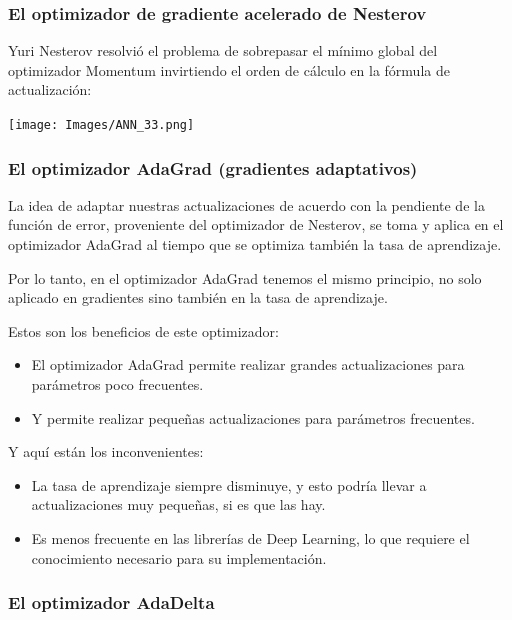 \documentclass[
]{book}
\providecommand{\tightlist}{%
  \setlength{\itemsep}{0pt}\setlength{\parskip}{0pt}}
\begin{document}
\hypertarget{el-optimizador-de-gradiente-acelerado-de-nesterov}{%
\subsubsection{El optimizador de gradiente acelerado de Nesterov}\label{el-optimizador-de-gradiente-acelerado-de-nesterov}}

Yuri Nesterov resolvió el problema de sobrepasar el mínimo global del optimizador Momentum invirtiendo el orden de cálculo en la fórmula de actualización:

\texttt{[image: Images/ANN\_33.png]}

\hypertarget{el-optimizador-adagrad-gradientes-adaptativos}{%
\subsubsection{El optimizador AdaGrad (gradientes adaptativos)}\label{el-optimizador-adagrad-gradientes-adaptativos}}

La idea de adaptar nuestras actualizaciones de acuerdo con la pendiente de la función de error, proveniente del optimizador de Nesterov, se toma y aplica en el optimizador AdaGrad al tiempo que se optimiza también la tasa de aprendizaje.

Por lo tanto, en el optimizador AdaGrad tenemos el mismo principio, no solo aplicado en gradientes sino también en la tasa de aprendizaje.

Estos son los beneficios de este optimizador:

\begin{itemize}
\tightlist
\item
  El optimizador AdaGrad permite realizar grandes actualizaciones para parámetros poco frecuentes.
\item
  Y permite realizar pequeñas actualizaciones para parámetros frecuentes.
\end{itemize}

Y aquí están los inconvenientes:

\begin{itemize}
\tightlist
\item
  La tasa de aprendizaje siempre disminuye, y esto podría llevar a actualizaciones muy pequeñas, si es que las hay.
\item
  Es menos frecuente en las librerías de Deep Learning, lo que requiere el conocimiento necesario para su implementación.
\end{itemize}

\hypertarget{el-optimizador-adadelta}{%
\subsubsection{El optimizador AdaDelta}\label{el-optimizador-adadelta}}
\end{document}
